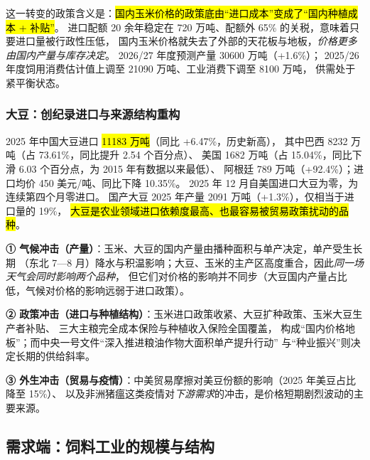 这一转变的政策含义是：\hl{国内玉米价格的政策底由“进口成本”变成了“国内种植成本 + 补贴”}。
进口配额 20 余年稳定在 720 万吨、配额外 65\% 的关税，意味着只要进口量被行政性压低，
国内玉米价格就失去了外部的天花板与地板，\emph{价格更多由国内产量与库存决定}。
2026/27 年度预测产量 \num{30600} 万吨（+1.6\%）\cite{casde119}；
2025/26 年度饲用消费估计值上调至 \num{21090} 万吨、工业消费下调至 \num{8100} 万吨\cite{casde119}，
供需处于紧平衡状态。

\subsubsection{大豆：创纪录进口与来源结构重构}

2025 年中国大豆进口 \hl{11183 万吨}（同比 +6.47\%，历史新高），
其中巴西 8232 万吨（占 73.61\%，同比提升 2.54 个百分点）、
美国 1682 万吨（占 15.04\%，同比下滑 6.03 个百分点，为 2015 年有数据以来最低）、
阿根廷 789 万吨（+92.4\%）；进口均价 450 美元/吨、同比下降 10.35\%\cite{zhuochuang2026soy,smm2026soy}。
2025 年 12 月自美国进口大豆为零，为连续第四个月零进口\cite{smm2026soy}。
国产大豆 2025 年产量 2091 万吨（+1.3\%）\cite{casde119}，仅相当于进口量的 19\%，
\hl{大豆是农业领域进口依赖度最高、也最容易被贸易政策扰动的品种}。

\begin{keybox}[供给端的三种冲击类型]
\normalsize
\textbf{① 气候冲击（产量）}：玉米、大豆的国内产量由播种面积与单产决定，单产受生长期
（东北 7---8 月）降水与积温影响；大豆、玉米的主产区高度重合，因此\emph{同一场天气会同时影响两个品种}，
但它们对价格的影响并不同步（大豆国内产量占比低，气候对价格的影响远弱于进口政策）。\par\vspace{3pt}
\textbf{② 政策冲击（进口与种植结构）}：玉米进口政策收紧、大豆扩种政策、玉米大豆生产者补贴、
三大主粮完全成本保险与种植收入保险全国覆盖\cite{cccp2024doc1}，
构成“国内价格地板”；而中央一号文件“深入推进粮油作物大面积单产提升行动”
与“种业振兴”\cite{cccp2025doc1}则决定长期的供给斜率。\par\vspace{3pt}
\textbf{③ 外生冲击（贸易与疫情）}：中美贸易摩擦对美豆份额的影响（2025 年美豆占比降至 15\%）、
以及非洲猪瘟这类疫情对\emph{下游需求}的冲击，是价格短期剧烈波动的主要来源。
\end{keybox}

\subsection{需求端：饲料工业的规模与结构}
\label{sec:grain-demand}

